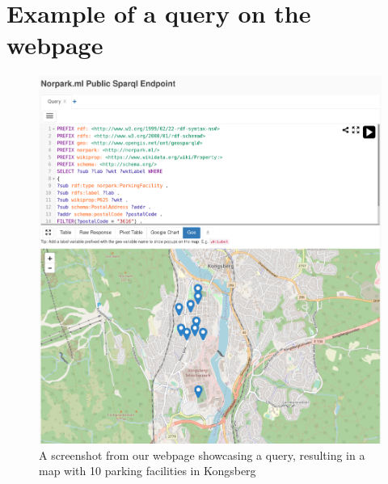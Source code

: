 \chapter{Example of a query on the webpage}
\label{appendix:query}
\begin{figure}[H]
	\centering
	\includegraphics[scale=0.22]{figures/query-screenshot.png}
	\caption{A screenshot from our webpage showcasing a query, resulting in a map with 10 parking facilities in Kongsberg}
\end{figure}

